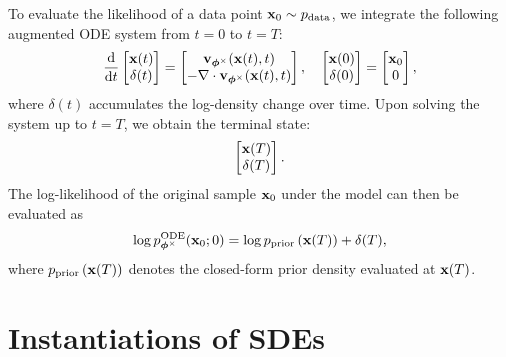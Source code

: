 To evaluate the likelihood of a data point ${\mathbf{x}}_0 \sim p_{\mathrm{data}}$, we integrate the following augmented ODE system from $t=0$ to $t=T$:
\begin{align}\label{eq:score-sde-likelihood}
\frac{\mathop{}\!\mathrm{d}}{\mathop{}\!\mathrm{d} t}
\begin{bmatrix}
\mathbf{x}(t) \\
\delta(t)
\end{bmatrix}
=
\begin{bmatrix}
{\mathbf{v}}_{{\bm{\phi}^\times}}(\mathbf{x}(t), t) \\
-\nabla \cdot {\mathbf{v}}_{{\bm{\phi}^\times}}(\mathbf{x}(t), t)
\end{bmatrix}, \quad
\begin{bmatrix}
\mathbf{x}(0) \\
\delta(0)
\end{bmatrix}
=
\begin{bmatrix}
\mathbf{x}_0 \\
0
\end{bmatrix},
\end{align}
where $\delta(t)$ accumulates the log-density change over time. Upon solving the system up to $t = T$, we obtain the terminal state:
\[
\begin{bmatrix}
{\mathbf{x}}(T) \\
\delta(T)
\end{bmatrix}.
\]
The log-likelihood of the original sample ${\mathbf{x}}_0$ under the model can then be evaluated as
\[
\log p^{\textup{ODE}}_{\bm{\phi}^\times}({\mathbf{x}}_0; 0) = \log p_{\mathrm{prior}}\left( {\mathbf{x}}(T) \right) + \delta(T),
\]
where $ p_{\mathrm{prior}}\left({\mathbf{x}}(T)\right) $ denotes the closed-form prior density evaluated at $ {\mathbf{x}}(T) $.




\newpage

\section{Instantiations of SDEs}\label{sec:instances}

